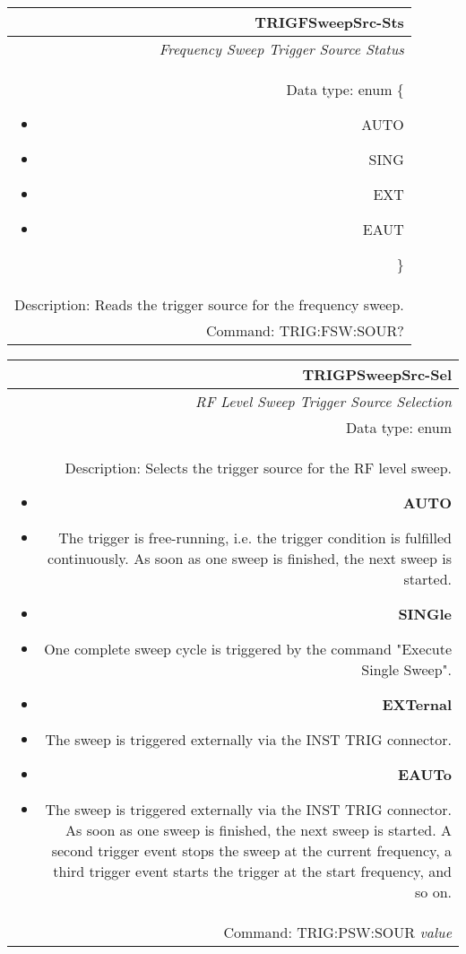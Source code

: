 \documentclass[openany]{article}
\begin{document}
		\begin{tabular}{N}
			\hline
			\bfseries TRIGFSweepSrc-Sts \\ \hline
			\emph{Frequency Sweep Trigger Source Status} \\
			Data type: enum \{\begin{itemize}[noitemsep]
				\small
				\item[] AUTO
				\item[] SING
				\item[] EXT
				\item[] EAUT
			\end{itemize}\} \\ 
			Description: Reads the trigger source for the frequency sweep. \\
			Command: TRIG:FSW:SOUR? \\

		\end{tabular}
%
		\begin{tabular}{N}
			\hline
			\bfseries TRIGPSweepSrc-Sel \\ \hline
			\emph{RF Level Sweep Trigger Source Selection} \\
			Data type: enum \\   
			Description: Selects the trigger source for the RF level sweep.\begin{itemize}[noitemsep]
				\small
				\item[] \textbf{AUTO}
				\item[] The trigger is free-running, i.e. the trigger condition is fulfilled continuously. As soon as one sweep is finished, the next sweep is started.
                                \item[] \textbf{SINGle}
				\item[] One complete sweep cycle is triggered by the command "Execute Single Sweep".
				\item[] \textbf{EXTernal}
				\item[] The sweep is triggered externally via the INST TRIG connector.
                                \item[] \textbf{EAUTo}
				\item[] The sweep is triggered externally via the INST TRIG connector. As soon as one sweep is finished, the next sweep is started. A second trigger event stops the sweep at the current frequency, a third trigger event starts the trigger at the start frequency, and so on.

			\end{itemize} \\
			Command: TRIG:PSW:SOUR \emph{value} \\

		\end{tabular}
\end{document}
